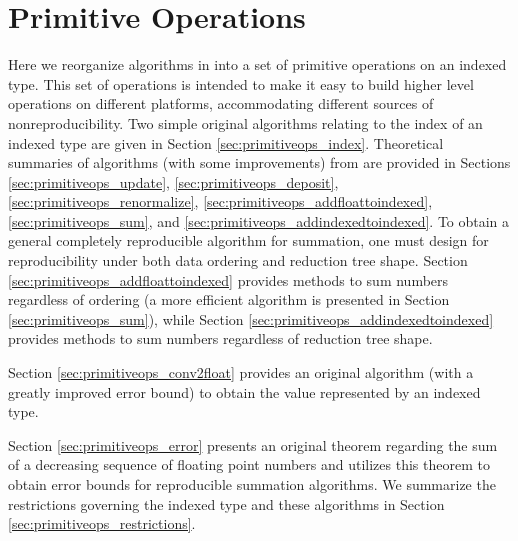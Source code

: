 \section{Primitive Operations}
    \label{sec:primitiveops}
    Here we reorganize algorithms in \cite{repsum} into a set of
    primitive operations on an indexed type. This set of operations is 
    intended to make it easy to build higher level operations on different
    platforms, accommodating different sources of nonreproducibility. Two simple original algorithms
    relating to the index of an indexed type are given in Section
    \ref{sec:primitiveops_index}. Theoretical summaries of algorithms (with
    some improvements) from \cite{repsum} are provided in Sections
    \ref{sec:primitiveops_update}, \ref{sec:primitiveops_deposit},
    \ref{sec:primitiveops_renormalize},
    \ref{sec:primitiveops_addfloattoindexed}, \ref{sec:primitiveops_sum},
    and \ref{sec:primitiveops_addindexedtoindexed}. To obtain a general
    completely reproducible algorithm for summation, one must design for
    reproducibility under both data ordering and reduction tree shape.
    Section \ref{sec:primitiveops_addfloattoindexed} provides methods to
    sum numbers regardless of ordering (a more efficient algorithm is presented in Section \ref{sec:primitiveops_sum}), while Section
    \ref{sec:primitiveops_addindexedtoindexed} provides methods to sum
    numbers regardless of reduction tree shape.

    Section \ref{sec:primitiveops_conv2float} provides an original algorithm (with a greatly
    improved error bound) to obtain the value represented by an indexed type.
    \begin{comment}
    For completeness, we state an algorithm to convert a single floating point number to an indexed type in Section \ref{sec:primitiveops_conv2indexed}.
    \end{comment}
    Section \ref{sec:primitiveops_error} presents an original theorem regarding the sum of a decreasing sequence of floating point numbers and utilizes this theorem to obtain error bounds for reproducible summation algorithms. We summarize the restrictions governing the indexed type and these algorithms in Section \ref{sec:primitiveops_restrictions}.

    
    
    
    
    
    
    
    
    
    

